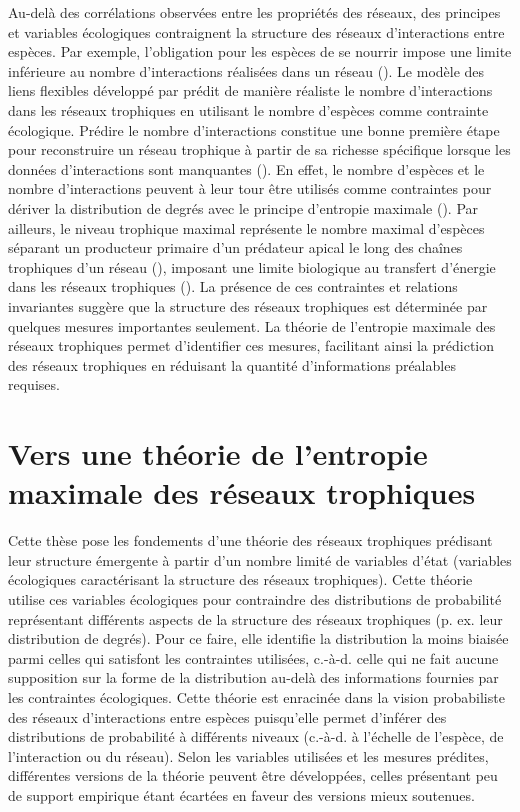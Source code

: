 Au-delà des corrélations observées entre les propriétés des réseaux, des
principes et variables écologiques contraignent la structure des réseaux
d'interactions entre espèces. Par exemple, l'obligation pour les espèces de se
nourrir impose une limite inférieure au nombre d'interactions réalisées dans un
réseau (\cite{MacDonald2020Revisiting}). Le modèle des liens flexibles développé
par \textcite{MacDonald2020Revisiting} prédit de manière réaliste le nombre
d'interactions dans les réseaux trophiques en utilisant le nombre d'espèces
comme contrainte écologique. Prédire le nombre d'interactions constitue une
bonne première étape pour reconstruire un réseau trophique à partir de sa
richesse spécifique lorsque les données d'interactions sont manquantes
(\cite{Strydom2021Roadmapa}). En effet, le nombre d'espèces et le nombre
d'interactions peuvent à leur tour être utilisés comme contraintes pour dériver
la distribution de degrés avec le principe d'entropie maximale
(\cite{Williams2011Biology}). Par ailleurs, le niveau trophique maximal
représente le nombre maximal d'espèces séparant un producteur primaire d'un
prédateur apical le long des chaînes trophiques d'un réseau
(\cite{Cohen1978Food}), imposant une limite biologique au transfert d'énergie
dans les réseaux trophiques (\cite{Williams2004Limits}). La présence de ces
contraintes et relations invariantes suggère que la structure des réseaux
trophiques est déterminée par quelques mesures importantes seulement. La théorie
de l'entropie maximale des réseaux trophiques permet d'identifier ces mesures,
facilitant ainsi la prédiction des réseaux trophiques en réduisant la quantité
d'informations préalables requises. 


\section{Vers une théorie de l'entropie maximale des réseaux trophiques}

Cette thèse pose les fondements d'une théorie des réseaux trophiques prédisant
leur structure émergente à partir d'un nombre limité de variables d'état
(variables écologiques caractérisant la structure des réseaux trophiques). Cette
théorie utilise ces variables écologiques pour contraindre des distributions de
probabilité représentant différents aspects de la structure des réseaux
trophiques (p. ex. leur distribution de degrés). Pour ce faire, elle identifie
la distribution la moins biaisée parmi celles qui satisfont les contraintes
utilisées, c.-à-d. celle qui ne fait aucune supposition sur la forme de la
distribution au-delà des informations fournies par les contraintes écologiques.
Cette théorie est enracinée dans la vision probabiliste des réseaux
d'interactions entre espèces puisqu'elle permet d'inférer des distributions de
probabilité à différents niveaux (c.-à-d. à l'échelle de l'espèce, de
l'interaction ou du réseau). Selon les variables utilisées et les mesures
prédites, différentes versions de la théorie peuvent être développées, celles
présentant peu de support empirique étant écartées en faveur des versions mieux
soutenues.


